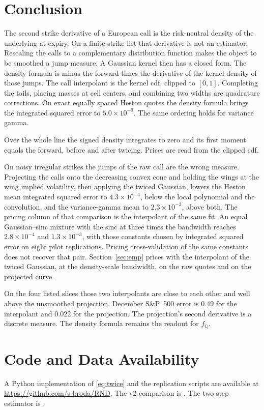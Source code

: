 \documentclass[preprint,12pt,authoryear,times]{elsarticle}
\newcommand{\Q}{\mathbb{Q}}
\begin{document}
\section{Conclusion}
\label{sec:conc}

The second strike derivative of a European call is the risk-neutral density of the underlying at expiry. On a finite strike list that derivative is not an estimator. Rescaling the calls to a complementary distribution function makes the object to be smoothed a jump measure. A Gaussian kernel then has a closed form. The density formula is minus the forward times the derivative of the kernel density of those jumps. The call interpolant is the kernel cdf, clipped to \([0,1]\). Completing the tails, placing masses at cell centers, and combining two widths are quadrature corrections. On exact equally spaced Heston quotes the density formula brings the integrated squared error to \(5.0\times 10^{-9}\). The same ordering holds for variance gamma.

Over the whole line the signed density integrates to zero and its first moment equals the forward, before and after twicing. Prices are read from the clipped cdf.

On noisy irregular strikes the jumps of the raw call are the wrong measure. Projecting the calls onto the decreasing convex cone and holding the wings at the wing implied volatility, then applying the twiced Gaussian, lowers the Heston mean integrated squared error to \(4.3\times 10^{-4}\), below the local polynomial and the convolution, and the variance-gamma mean to \(2.3\times 10^{-3}\), above both. The pricing column of that comparison is the interpolant of the same fit. An equal Gaussian--sinc mixture with the sinc at three times the bandwidth reaches \(2.8\times 10^{-4}\) and \(1.3\times 10^{-3}\), with those constants chosen by integrated squared error on eight pilot replications. Pricing cross-validation of the same constants does not recover that pair. Section~\ref{sec:emp} prices with the interpolant of the twiced Gaussian, at the density-scale bandwidth, on the raw quotes and on the projected curve.

On the four listed slices those two interpolants are close to each other and well above the unsmoothed projection. December S\&P~500 error is \(0.49\) for the interpolant and \(0.022\) for the projection. The projection's second derivative is a discrete measure. The density formula remains the readout for \(f_{\Q}\).

\section*{Code and Data Availability}
A Python implementation of \eqref{eq:twice} and the replication scripts are available at \url{https://github.com/s-broda/RND}.
The v2 comparison is .
The two-step estimator is .



\end{document}
